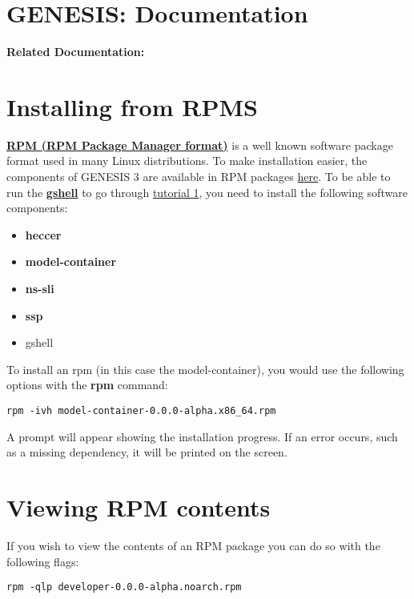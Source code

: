 \documentclass[12pt]{article}
\begin{document}
\section*{GENESIS: Documentation}

{\bf Related Documentation:}

\section*{Installing from RPMS}

\href{http://rpm.org}{\bf RPM (RPM Package Manager format)} is a well known software package format used in many Linux distributions. To make installation easier, the components of GENESIS 3 are available in RPM packages \href{http://repo-genesis3.cbi.utsa.edu/rpm/}{here}. To be able to run the \href{../gshell/gshell.tex}{\bf gshell} to go through \href{../tutorial1/tutorial1.tex}{tutorial 1}, you need to install the following software components:

\begin{itemize}
	\item[] {\bf heccer}
	\item[] {\bf model-container}
	\item[] {\bf ns-sli}
	\item[] {\bf ssp}
	\item[] {\br gshell}
\end{itemize}

To install an rpm (in this case the model-container), you would use the following options with the {\bf rpm} command:

\begin{verbatim}
rpm -ivh model-container-0.0.0-alpha.x86_64.rpm
\end{verbatim}

A prompt will appear showing the installation progress. If an error occurs, such as a missing dependency, it will be printed on the screen. 


\section*{Viewing RPM contents}

If you wish to view the contents of an RPM package you can do so with the following flags:

\begin{verbatim}
rpm -qlp developer-0.0.0-alpha.noarch.rpm
\end{verbatim}
\end{document}
